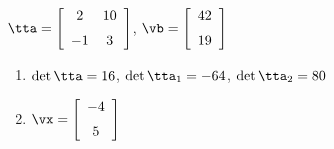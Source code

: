 {$\tta = \left[ \begin {array}{cc} 2&10\\\noalign{\medskip}-1&3\end {array}
 \right]$,
 \quad
$\vb = \left[ \begin {array}{c} 42\\\noalign{\medskip}19\end {array}
 \right]$}
{\begin{enumerate}
\item	$\det{\tta} = 16$, $\det{\tta_1} = -64$, $\det{\tta_2} = 80$
\item $\vx = \left[ \begin {array}{c} -4\\\noalign{\medskip}5\end {array} \right]$
\end{enumerate}
}
  
